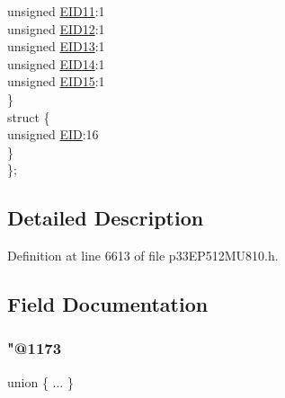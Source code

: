 \begin{DoxyCompactItemize}
\begin{tabbing}
\>\>unsigned \hyperlink{structtag_c2_r_x_f7_e_i_d_b_i_t_s_a710bdb0d602deb021b0be99066008018}{EID11}:1\\
\>\>unsigned \hyperlink{structtag_c2_r_x_f7_e_i_d_b_i_t_s_aa347bb85867bd8d4e0124f7cff8c6472}{EID12}:1\\
\>\>unsigned \hyperlink{structtag_c2_r_x_f7_e_i_d_b_i_t_s_a37d5f3edcbf6ef62f848fd4f3c584f79}{EID13}:1\\
\>\>unsigned \hyperlink{structtag_c2_r_x_f7_e_i_d_b_i_t_s_a7ffc0b0e0d99b8476b6f9a45337c17ab}{EID14}:1\\
\>\>unsigned \hyperlink{structtag_c2_r_x_f7_e_i_d_b_i_t_s_a293cd7dc1746257fa75a60cbd9383cd7}{EID15}:1\\
\>\} \\
\>struct \{\\
\>\>unsigned \hyperlink{structtag_c2_r_x_f7_e_i_d_b_i_t_s_ae80b378c9141f7c03e0b4e55b5f4b54d}{EID}:16\\
\>\} \\
\}; \\

\end{tabbing}\end{DoxyCompactItemize}


\subsection{Detailed Description}


Definition at line 6613 of file p33\+E\+P512\+M\+U810.\+h.



\subsection{Field Documentation}
\mbox{\label{structtag_c2_r_x_f7_e_i_d_b_i_t_s_ac15126ec37c9f330b77f4629184b429b}} 
\subsubsection{\texorpdfstring{"@1173}{@1173}}
{\footnotesize\ttfamily union \{ ... \} }

\mbox{\label{structtag_c2_r_x_f7_e_i_d_b_i_t_s_ae80b378c9141f7c03e0b4e55b5f4b54d}} 
